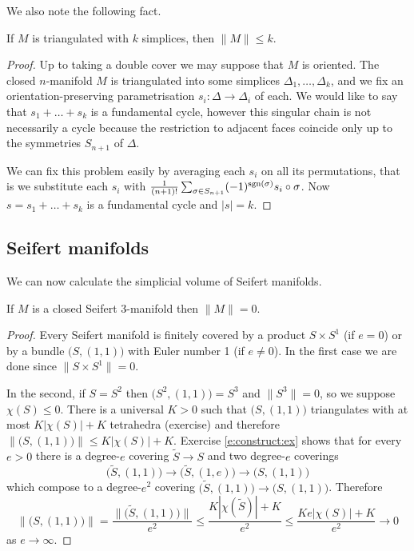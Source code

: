 We also note the following fact.

\begin{prop}
If $M$ is triangulated with $k$ simplices, then $\|M\| \leqslant k$.
\end{prop}
\begin{proof}
Up to taking a double cover we may suppose that $M$ is oriented. The closed $n$-manifold $M$ is triangulated into some simplices $\Delta_1, \ldots, \Delta_k$, and
we fix an orientation-preserving parametrisation $s_i\colon \Delta \to \Delta_i$ of each.
We would like to say that $s_1+\ldots + s_k$ is a fundamental cycle, however this singular chain is not necessarily a cycle because the restriction to adjacent faces coincide only up to the symmetries $S_{n+1}$ of $\Delta$. 

We can fix this problem easily by averaging each $s_i$ on all its permutations, that is we substitute each $s_i$ with $\frac{1}{(n+1)!}\sum_{\sigma \in S_{n+1}} (-1)^{{\rm sgn}(\sigma)} s_i \circ \sigma$. Now $s=s_1+\ldots + s_k$ is a fundamental cycle and $|s| = k$.
\end{proof}

\subsection{Seifert manifolds}
We can now calculate the simplicial volume of Seifert manifolds.

\begin{prop}
If $M$ is a closed Seifert 3-manifold then $\|M\|=0$.
\end{prop}
\begin{proof}
Every Seifert manifold is finitely covered by a product $S \times S^1$ (if $e=0$) or by a bundle $\big(S,(1,1)\big)$ with Euler number 1 (if $e\neq 0$). In the first case we are done since $\|S\times S^1\|=0$. 

In the second, if $S=S^2$ then $\big(S^2,(1,1)\big)=S^3$ and $\|S^3\|=0$, so we suppose $\chi(S)\leqslant 0$. There is a universal $K>0$ such that $\big(S,(1,1)\big)$ triangulates with at most $K|\chi (S)|+K$ tetrahedra (exercise) and therefore $\big\|\big(S,(1,1)\big)\big\| \leqslant K|\chi(S)|+K$. Exercise \ref{e:construct:ex} shows that for every $e>0$ there is a degree-$e$ covering $\tilde S \to S$ and two degree-$e$ coverings
$$\big(\tilde S, (1,1)\big) \longrightarrow \big(\tilde S, (1,e)\big) \longrightarrow \big(S,(1,1)\big)$$
which compose to a degree-$e^2$ covering 
$\big(\tilde S, (1,1)\big) \to \big(S,(1,1)\big)$. Therefore
$$\big\|\big(S, (1,1) \big) \big\| = \frac{\big\|\big(\tilde S, (1,1) \big) \big\|}{e^2} \leqslant \frac{K|\chi(\tilde S)| + K}{e^2} \leqslant \frac{Ke|\chi(S)| + K}{e^2} \to 0$$
as $e \to \infty$.
\end{proof}


